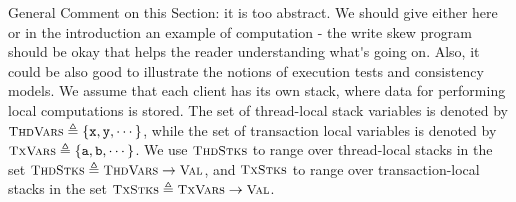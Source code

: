 \ac{General Comment on this Section: it is too abstract. We 
should give either here or in the introduction an example of computation - 
the write skew program should be okay that helps the reader understanding 
what's going on. Also, it could be also good to illustrate the notions 
of execution tests and consistency models.}
We assume that each client has its own stack, 
where data for performing local computations is stored. 
The set of thread-local stack variables is denoted by $\ThreadVars \defeq \{\pvar{x}, \pvar{y}, \cdots\}$, 
while the set of transaction local variables is denoted by $\TxVars \defeq \{\pvar{a}, \pvar{b}, \cdots\}$. 
We use $\ThdStacks$ to range over thread-local stacks in the set $\ThdStacks \defeq \ThreadVars \to \Val$, 
and $\TxStacks$ to range over transaction-local stacks in the set $\TxStacks \defeq \TxVars \to \Val$.

